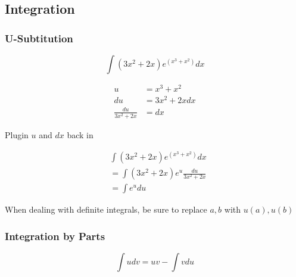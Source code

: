   \subsection{Integration}

    \subsubsection{U-Subtitution}

      \begin{displaymath}
        \int \left( 3x^{2} + 2x \right) e^{\left( x^{3} + x^{2} \right)} dx
      \end{displaymath}

      \begin{align*}
        u &= x^{3} + x^{2} \\
        du &= 3x^{2} + 2x dx \\
        \frac{du}{3x^{2} + 2x} &= dx
      \end{align*}

      Plugin $ u $ and $ dx $ back in

      \begin{align*}
        &\int \left( 3x^{2} + 2x \right) e^{\left( x^{3} + x^{2} \right)} dx \\
        &= \int \left( 3x^{2} + 2x \right) e^{u} \frac{du}{3x^{2} + 2x} \\
        &= \int e^{u} du
      \end{align*}

      When dealing with definite integrals, be sure to replace $ a, b $ with
      $ u\left( a \right), u\left( b \right) $

    \subsubsection{Integration by Parts}

      \begin{equation}
        \int u dv = uv - \int v du
      \end{equation}